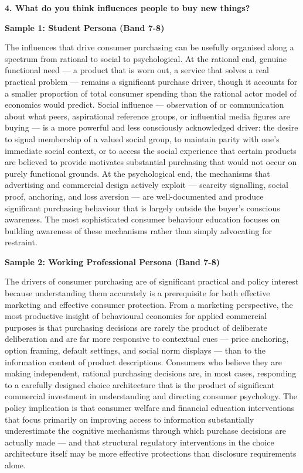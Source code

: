 \separator

\begin{ieltsquestion}
\textbf{4. What do you think influences people to buy new things?}
\end{ieltsquestion}
\textbf{Sample 1: Student Persona (Band 7-8)}

The influences that drive consumer purchasing can be usefully organised along a spectrum from rational to social to psychological. At the rational end, genuine functional need — a product that is worn out, a service that solves a real practical problem — remains a significant purchase driver, though it accounts for a smaller proportion of total consumer spending than the rational actor model of economics would predict. Social influence — observation of or communication about what peers, aspirational reference groups, or influential media figures are buying — is a more powerful and less consciously acknowledged driver: the desire to signal membership of a valued social group, to maintain parity with one's immediate social context, or to access the social experience that certain products are believed to provide motivates substantial purchasing that would not occur on purely functional grounds. At the psychological end, the mechanisms that advertising and commercial design actively exploit — scarcity signalling, social proof, anchoring, and loss aversion — are well-documented and produce significant purchasing behaviour that is largely outside the buyer's conscious awareness. The most sophisticated consumer behaviour education focuses on building awareness of these mechanisms rather than simply advocating for restraint.

\textbf{Sample 2: Working Professional Persona (Band 7-8)}

The drivers of consumer purchasing are of significant practical and policy interest because understanding them accurately is a prerequisite for both effective marketing and effective consumer protection. From a marketing perspective, the most productive insight of behavioural economics for applied commercial purposes is that purchasing decisions are rarely the product of deliberate deliberation and are far more responsive to contextual cues — price anchoring, option framing, default settings, and social norm displays — than to the information content of product descriptions. Consumers who believe they are making independent, rational purchasing decisions are, in most cases, responding to a carefully designed choice architecture that is the product of significant commercial investment in understanding and directing consumer psychology. The policy implication is that consumer welfare and financial education interventions that focus primarily on improving access to information substantially underestimate the cognitive mechanisms through which purchase decisions are actually made — and that structural regulatory interventions in the choice architecture itself may be more effective protections than disclosure requirements alone.

